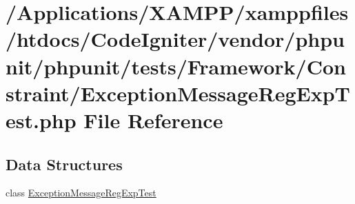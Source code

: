 \hypertarget{_exception_message_reg_exp_test_8php}{}\section{/\+Applications/\+X\+A\+M\+P\+P/xamppfiles/htdocs/\+Code\+Igniter/vendor/phpunit/phpunit/tests/\+Framework/\+Constraint/\+Exception\+Message\+Reg\+Exp\+Test.php File Reference}
\label{_exception_message_reg_exp_test_8php}
\subsection*{Data Structures}
\begin{DoxyCompactItemize}
\item 
class \mbox{\hyperlink{class_exception_message_reg_exp_test}{Exception\+Message\+Reg\+Exp\+Test}}
\end{DoxyCompactItemize}
